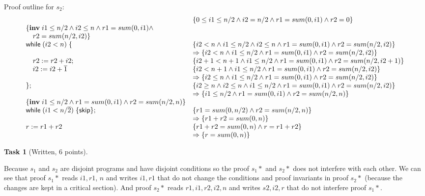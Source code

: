 \documentclass{article}
\newcommand{\stmt}[1]{\text{\sffamily #1}}
\newcommand{\while}[1]{\stmt{while}\;(#1)\;\{}
\newcommand{\assign}[2]{#1 := #2}
\newcommand{\const}[1]{\overline{#1}}
\newcommand{\inv}[1]{\{\textbf{inv}\;\ensuremath{#1}\}}
\newcommand{\skips}{\stmt{skip}}
\theoremstyle{task}
\newtheorem{task}{Task}[section]
\begin{document}
\vspace{1em}
Proof outline for $s_2$:
\[
    \begin{array}{l l}
        & \{0 \leq i1 \leq n/2 \wedge i2 = n/2 \wedge r1 = sum(0, i1) \wedge r2 = 0\} \\
        \inv{i1 \leq n/2 \wedge i2 \leq n \wedge r1 = sum(0, i1) \wedge \\
        \quad r2 = sum(n/2, i2)} & \\
        \while{i2 < n} & \{i2 < n \wedge i1 \leq n/2 \wedge i2 \leq n \wedge r1 = sum(0, i1) \wedge r2 = sum(n/2, i2)\} \\
                       & \Rightarrow \{i2 < n \wedge i1 \leq n/2 \wedge r1 = sum(0, i1) \wedge r2 = sum(n/2, i2)\} \\
        \quad \assign{r2}{r2 + i2}; & \{i2 + 1 < n + 1 \wedge i1 \leq n/2 \wedge r1 = sum(0, i1) \wedge r2 = sum(n/2, i2+1)\} \\
        \quad \assign{i2}{i2 + \const{1}} & \{i2 < n + 1 \wedge i1 \leq n/2 \wedge r1 = sum(0, i1) \wedge r2 = sum(n/2, i2)\} \\
                                          & \Rightarrow \{i2 \leq n \wedge i1 \leq n/2 \wedge r1 = sum(0, i1) \wedge r2 = sum(n/2, i2)\} \\
        \}; & \{i2 \geq n \wedge i2 \leq n \wedge i1 \leq n/2 \wedge r1 = sum(0, i1) \wedge r2 = sum(n/2, i2)\} \\
            & \Rightarrow \{i1 \leq n/2 \wedge r1 = sum(0, i1) \wedge r2 = sum(n/2, n)\} \\
        \inv{i1 \leq n/2 \wedge r1 = sum(0, i1) \wedge r2 = sum(n/2, n)} & \\
        \while{i1 < n/\const{2}} \skips\}; & \{r1 = sum(0, n/2) \wedge r2 = sum(n/2, n)\} \\
                                           & \Rightarrow \{r1 + r2 = sum(0, n)\} \\
        \assign{r}{r1 + r2} & \{r1 + r2 = sum(0, n) \wedge r = r1 + r2\} \\
                            & \Rightarrow \{r = sum(0, n)\}
    \end{array}
\]

\pagebreak
\begin{task}[Written, 6 points]
\end{task}
Because $s_1$ and $s_2$ are disjoint programs and have disjoint conditions
so the proof $s_1*$ and $s_2*$ does not interfere with each other. We can
see that proof $s_1*$ reads $i1, r1$, $n$  and writes $i1, r1$ that do not
change the conditions and proof invariants in proof $s_2*$ (because the changes
are kept in a critical section). And proof $s_2*$ reads $r1, i1, r2, i2, n$ and
writes $s2, i2, r$ that do not interfere proof $s_1*$.
\end{document}
